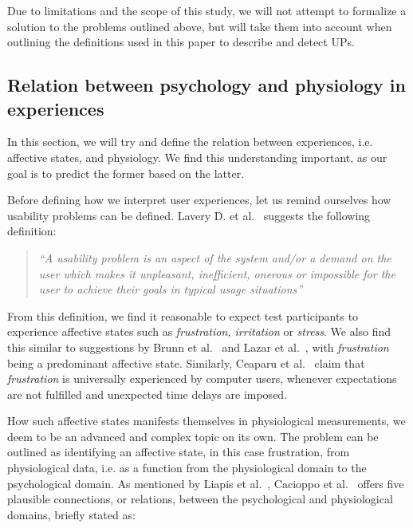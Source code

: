Due to limitations and the scope of this study, we will not attempt to formalize a solution to the problems outlined
above, but will take them into account when outlining the definitions used in this paper to describe and detect UPs.

\subsection{Relation between psychology and physiology in experiences}
In this section, we will try and define the relation between experiences, i.e. affective states, and physiology. We find
this understanding important, as our goal is to predict the former based on the latter.

Before defining how we interpret user experiences, let us remind ourselves how usability problems can be
defined. Lavery D. et al.~\cite[p. 254]{comp-eval-methods} suggests the following definition:

\begin{quotation}
  \textit{``A usability problem is an aspect of the system and/or a demand on the user which makes it unpleasant,
    inefficient, onerous or impossible for the user to achieve their goals in typical usage situations''} 
\end{quotation}

From this definition, we find it reasonable to expect test participants to experience affective states such as
\textit{frustration, irritation} or \textit{stress}. We also find this similar to suggestions by Brunn et
al.~\cite{LH-paper} and Lazar et al.~\cite{frustration_with_computers}, with \textit{frustration} being a predominant
affective state. Similarly, Ceaparu et al.~\cite{determining-causes-end-user-frust} claim that \textit{frustration} is
universally experienced by computer users, whenever expectations are not fulfilled and unexpected time delays are
imposed.

How such affective states manifests themselves in physiological measurements, we deem to be an advanced and complex
topic on its own. The problem can be outlined as identifying an affective state, in this case frustration, from
physiological data, i.e. as a function from the physiological domain to the psychological domain.  As mentioned by
Liapis et al.~\cite{fusion4}, Cacioppo et al.~\cite[p. 8-9]{handbook-psychophysiology} offers five plausible
connections, or relations, between the psychological and physiological domains, briefly stated as:

